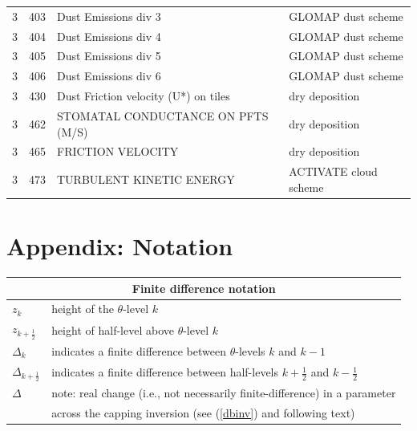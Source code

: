 \documentclass{UMDP_article}
\begin{document}
\begin{table}[htp]
\begin{center}
\begin{tabular}{|p{0.5cm}|p{0.7cm}|p{6cm}|p{6cm}|}
      3 & 403  & Dust Emissions div 3  & GLOMAP dust scheme \\
      3 & 404  & Dust Emissions div 4  & GLOMAP dust scheme \\
      3 & 405  & Dust Emissions div 5  & GLOMAP dust scheme \\
      3 & 406  & Dust Emissions div 6  & GLOMAP dust scheme \\
      3 & 430  & Dust Friction velocity (U*) on tiles &  dry deposition \\
      3 & 462  & STOMATAL CONDUCTANCE ON PFTS (M/S) &  dry deposition \\
      3 & 465  & FRICTION VELOCITY &  dry deposition  \\
      3 & 473  & TURBULENT KINETIC ENERGY &  ACTIVATE cloud scheme \\
      \hline
    \end{tabular}
  \end{center}
\end{table}

\section{Appendix: Notation}
\label{app:not}

\begin{flushleft}
  \begin{tabular}{|l|l|}
    \hline
    \multicolumn{2}{|c|}{Finite difference notation} \\
    \hline
    $z_k$ & height of the $\theta$-level $k$ \\
    $z_{k+\frac{1}{2}}$ & height of half-level above $\theta$-level $k$ \\
    $\Delta_k$ & indicates a finite difference between $\theta$-levels $k$ and
    $k-1$ \\ 
    $\Delta_{k+\frac{1}{2}}$ & indicates a finite difference between
    half-levels $k+\frac{1}{2}$ and $k-\frac{1}{2}$ \\
    $\Delta$ & note: real change (\mbox{i.e.}, not necessarily
    finite-difference) in a parameter \\ 
    & across the capping inversion (see (\ref{dbinv}) and following text) \\
    \hline
  \end{tabular}
\end{flushleft}
\end{document}
